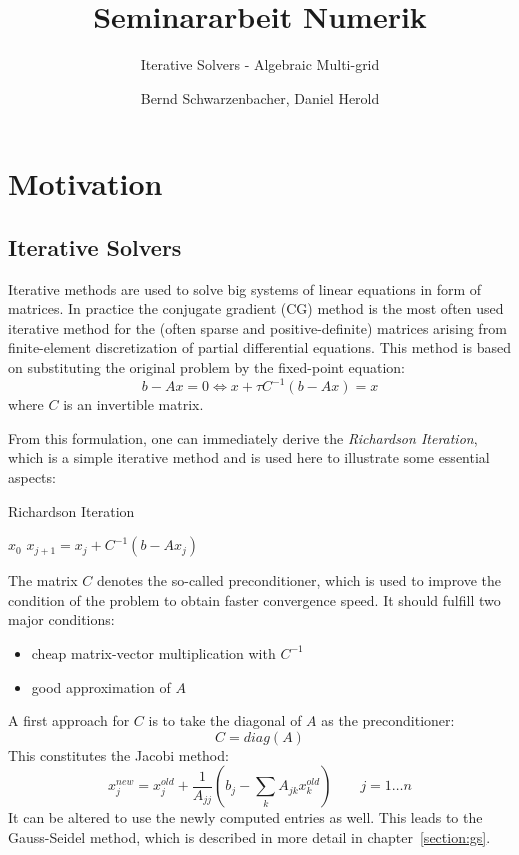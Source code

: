\documentclass[a4paper,11pt]{scrartcl}
\title{Seminararbeit Numerik}
\subtitle{Iterative Solvers - Algebraic Multi-grid}
\author{Bernd Schwarzenbacher, Daniel Herold}
\begin{document}
\maketitle
\tableofcontents
\pagebreak

\section{Motivation} \label{section:motiv}
\subsection{Iterative Solvers} \label{section:iter}
Iterative methods are used to solve big systems of linear equations in form of
matrices.
In practice the conjugate gradient (CG) method is the most often used iterative method for
the (often sparse and positive-definite) matrices arising from finite-element
discretization of partial differential equations.
This method is based on substituting the original problem by the fixed-point
equation:
$$b-Ax = 0 \iff x + \tau C^{-1} (b-Ax) = x$$
where $C$ is an invertible matrix.

From this formulation, one can immediately derive the
{\em Richardson Iteration}\/, which is a simple iterative method and is
used here to illustrate some essential aspects:

\begin{algorithm}
\caption{Richardson Iteration}
\begin{algorithmic}
  \STATE {} \: $x_{0}$
    \STATE $x_{j+1} = x_{j} + C^{-1} (b - Ax_{j})$
  \ENDFOR
\end{algorithmic}
\end{algorithm}

The matrix $C$ denotes the so-called preconditioner, which is used to
improve the condition of the problem to obtain faster convergence speed.
It should fulfill two major conditions:
\begin{itemize}
\item cheap matrix-vector multiplication with $C^{-1}$
\item good approximation of $A$
\end{itemize}

A first approach for $C$ is to take the diagonal of $A$ as the
preconditioner:
$$C = diag(A)$$
This constitutes the {Jacobi method}:
$$ x_j^{new} = x_j^{old} + \frac{1}{A_{jj}} \left(b_{j} -
               \sum_{k} A_{jk} x_k^{old}\right)
               \qquad j = 1 \dots n$$
It can be altered to use the newly computed entries as well. This leads to
the {Gauss-Seidel method}, which is described in more detail in
chapter~\ref{section:gs}.
\cite{iterative}
\end{document}
